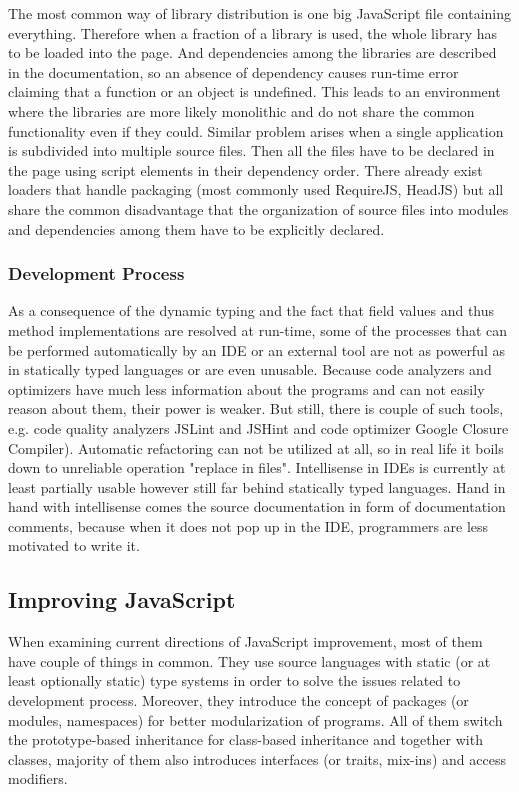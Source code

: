 \documentclass[12pt,a4paper]{report}
\begin{document}
The most common way of library distribution is one big JavaScript file containing everything. Therefore when a fraction of a library is used, the whole library has to be loaded into the page. And dependencies among the libraries are described in the documentation, so an absence of dependency causes run-time error claiming that a function or an object is undefined. This leads to an environment where the libraries are more likely monolithic and do not share the common functionality even if they could. Similar problem arises when a single application is subdivided into multiple source files. Then all the files have to be declared in the page using script elements in their dependency order. There already exist loaders that handle packaging (most commonly used RequireJS\cite{RequireJs}, HeadJS\cite{HeadJs}) but all share the common disadvantage that the organization of source files into modules and dependencies among them have to be explicitly declared.

\subsubsection*{Development Process} 

As a consequence of the dynamic typing and the fact that field values and thus method implementations are resolved at run-time, some of the processes that can be performed automatically by an IDE or an external tool are not as powerful as in statically typed languages or are even unusable. Because code analyzers and optimizers have much less information about the programs and can not easily reason about them, their power is weaker. But still, there is couple of such tools, e.g. code quality analyzers JSLint\cite{JsLint} and JSHint\cite{JsHint} and code optimizer Google Closure Compiler\cite{GoogleClosure}). Automatic refactoring can not be utilized at all, so in real life it boils down to unreliable operation "replace in files". Intellisense in IDEs is currently at least partially usable however still far behind statically typed languages. Hand in hand with intellisense comes the source documentation in form of documentation comments, because when it does not pop up in the IDE, programmers are less motivated to write it.

\subsection{Improving JavaScript}

When examining current directions of JavaScript improvement, most of them have couple of things in common. They use source languages with static (or at least optionally static) type systems in order to solve the issues related to development process. Moreover, they introduce the concept of packages (or modules, namespaces) for better modularization of programs. All of them switch the prototype-based inheritance for class-based inheritance and together with classes, majority of them also introduces interfaces (or traits, mix-ins) and access modifiers.
\end{document}
